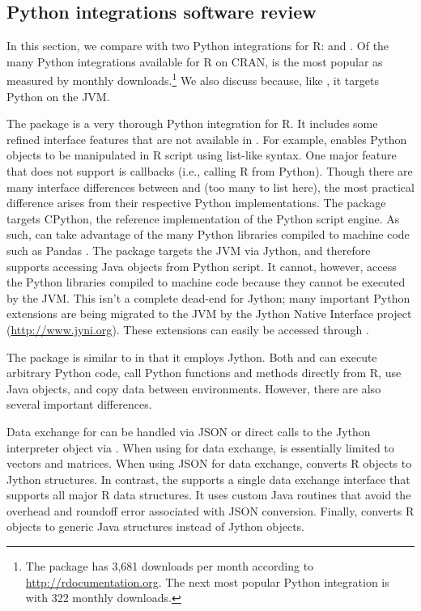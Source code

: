 \hypertarget{python-integrations}{}
\subsection{Python integrations software review}

In this section, we compare  with two Python integrations for R:  \citep{reticulate} and  \citep{rjython}. Of the many Python integrations available for R on CRAN,  is the most popular as measured by monthly downloads.\footnote{The  package has 3,681 downloads per month according to \url{http://rdocumentation.org}. The next most popular Python integration is  \citep{pythoninr} with 322 monthly downloads.} We also discuss  because, like , it targets Python on the JVM.

The  package is a very thorough Python integration for R. It includes some refined interface features that are not available in . For example,  enables Python objects to be manipulated in R script using list-like syntax. One major  feature that  does not support is callbacks (i.e., calling R from Python). Though there are many interface differences between  and  (too many to list here), the most practical difference arises from their respective Python implementations. The  package targets CPython, the reference implementation of the Python script engine. As such,  can take advantage of the many Python libraries compiled to machine code such as Pandas \citep{pandas}. The  package targets the JVM via Jython, and therefore supports accessing Java objects from Python script. It cannot, however, access the Python libraries compiled to machine code because they cannot be executed by the JVM. This isn't a complete dead-end for Jython; many important Python extensions are being migrated to the JVM by the Jython Native Interface project (\url{http://www.jyni.org}). These extensions can easily be accessed through .

The  package is similar to  in that it employs Jython. Both  and  can execute arbitrary Python code, call Python functions and methods directly from R, use Java objects, and copy data between environments. However, there are also several important differences.

Data exchange for  can be handled via JSON or direct calls to the Jython interpreter object via . When using  for data exchange,  is essentially limited to vectors and matrices. When using JSON for data exchange,  converts R objects to Jython structures. In contrast, the  supports a single data exchange interface that supports all major R data structures. It uses custom Java routines that avoid the overhead and roundoff error associated with JSON conversion. Finally,  converts R objects to generic Java structures instead of Jython objects.


